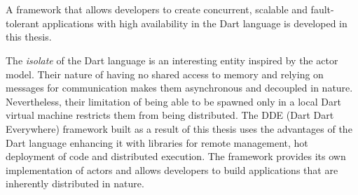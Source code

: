 \chapter{\abstractname}

  A framework that allows developers to create concurrent, scalable and fault-tolerant applications with high availability in the Dart language is developed in this thesis.

  The \emph{isolate} of the Dart language is an interesting entity inspired by the actor model. Their nature of having no shared access to memory and relying on messages for communication makes them asynchronous and decoupled in nature. Nevertheless, their limitation of being able to be spawned only in a local Dart virtual machine restricts them from being distributed. The \acrshort{DDE} (Dart Dart Everywhere) framework built as a result of this thesis uses the advantages of the Dart language enhancing it with libraries for remote management, hot deployment of code and distributed execution. The framework provides its own implementation of actors and allows developers to build applications that are inherently distributed in nature.
